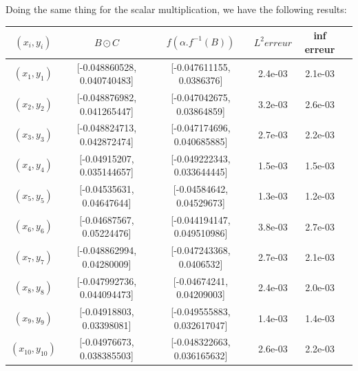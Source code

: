 \documentclass{report}
\begin{document}
            Doing the same thing for the scalar multiplication, we have the following results:\\

            \begin{tabular}{|c|c|c|c|c|c|}
                \hline
                $(x_i, y_i)$  & $B \odot C$ & $f(\alpha . f^{-1}(B))$ & $L^2 erreur$ & inf erreur \\
                \hline
                $(x_1, y_1)$ & [-0.048860528, 0.040740483] & [-0.047611155, 0.0386376] & 2.4e-03 & 2.1e-03 \\
                $(x_2, y_2)$ &  [-0.048876982, 0.041265447] & [-0.047042675, 0.03864859] & 3.2e-03 & 2.6e-03 \\
                $(x_3, y_3)$ & [-0.048824713, 0.042872474] & [-0.047174696, 0.040685885] & 2.7e-03 & 2.2e-03 \\
                $(x_4, y_4)$ &  [-0.04915207, 0.035144657] & [-0.049222343, 0.033644445] & 1.5e-03 & 1.5e-03 \\
                $(x_5, y_5)$ & [-0.04535631, 0.04647644] & [-0.04584642, 0.04529673] & 1.3e-03 & 1.2e-03 \\
                $(x_6, y_6)$ & [-0.04687567, 0.05224476] & [-0.044194147, 0.049510986] & 3.8e-03 & 2.7e-03 \\
                $(x_7, y_7)$ &  [-0.048862994, 0.04280009] & [-0.047243368, 0.0406532] & 2.7e-03 & 2.1e-03 \\
                $(x_8, y_8)$ & [-0.047992736, 0.044094473] & [-0.04674241, 0.04209003] & 2.4e-03 & 2.0e-03 \\
                $(x_9, y_9)$ &  [-0.04918803, 0.03398081] & [-0.049555883, 0.032617047] & 1.4e-03 & 1.4e-03 \\
                $(x_{10}, y_{10})$ & [-0.04976673, 0.038385503] & [-0.048322663, 0.036165632] & 2.6e-03 & 2.2e-03 \\
                \hline
            \end{tabular}
            \\
\end{document}
